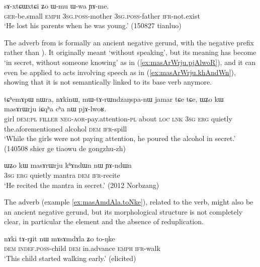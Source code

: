 \begin{exe}
\ex \label{ex:sAxtCWtCi.YAme}
\gll sɤ-xtɕɯ\redp{}xtɕi ʑo ɯ-mu ɯ-wa ɲɤ-me. \\
\textsc{ger}-be.small \textsc{emph} \textsc{3sg}.\textsc{poss}-mother  \textsc{3sg}.\textsc{poss}-father \textsc{ifr}-not.exist \\ 
\glt `He lost his parents when he was young.' (150827 tianluo) 
\end{exe}

The adverb   from  is formally an ancient negative gerund, with the negative prefix  rather than ). It originally meant `without speaking', but its meaning has become `in secret, without someone knowing' as in (\ref{ex:masArWrju.pjAlwoR}), and it can even be applied to acts involving speech as in (\ref{ex:masArWrju.khAndWn}), showing that it is not semantically linked to its base verb anymore.

\begin{exe}
\ex \label{ex:masArWrju.pjAlwoR}
\gll  tɕʰemɤpɯ nɯra, nɤkinɯ, mɯ-tɤ-rɯndzaŋspa-nɯ jamar tɕe tɕe,
ɯʑo kɯ masɤrɯrju iɕqʰa cʰa nɯ pjɤ-lwoʁ. \\
girl \textsc{dem}:\textsc{pl} \textsc{filler} \textsc{neg}-\textsc{aor}-pay.attention-\textsc{pl} about \textsc{loc} \textsc{lnk} \textsc{3sg} \textsc{erg} quietly the.aforementioned alcohol \textsc{dem} \textsc{ifr}-spill \\
\glt `While the girls were not paying attention, he poured the alcohol in secret.' (140508 shier ge tiaowu de gongzhu-zh)
\end{exe}

\begin{exe}
\ex \label{ex:masArWrju.khAndWn}
\gll ɯʑo kɯ masɤrɯrju kʰɤndɯn nɯ ɲɤ-ndɯn \\
\textsc{3sg} \textsc{erg} quietly mantra \textsc{dem} \textsc{ifr}-recite \\
\glt `He recited the mantra in secret.' (2012 Norbzang)
\end{exe}

The adverb  (example \ref{ex:masAmdAla.toNke}), related to the verb, might also be an ancient negative gerund, but its morphological structure is not completely clear, in particular the element  and the absence of reduplication. 

\begin{exe}
\ex \label{ex:masAmdAla.toNke}
\gll nɤki tɤ-rɟit nɯ mɤsɤmdɤla ʑo to-ŋke \\
\textsc{dem} \textsc{indef}.\textsc{poss}-child \textsc{dem} in.advance \textsc{emph} \textsc{ifr}-walk \\
\glt `This child started walking early.' (elicited)
\end{exe}

